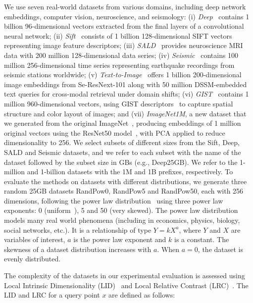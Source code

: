 We use seven real-world datasets from various domains, including deep network embeddings, computer vision, neuroscience, and seismology:  
(i) \emph{Deep}~\cite{url/data/deep1b} contains 1 billion 96-dimensional vectors extracted from the final layers of a convolutional neural network;  
(ii) \emph{Sift}~\cite{conf/icassp/jegou2011,url/data/sift} consists of 1 billion 128-dimensional SIFT vectors representing image feature descriptors;  
(iii) \emph{SALD}~\cite{url/data/eeg} provides neuroscience MRI data with 200 million 128-dimensional data series;  
(iv) \emph{Seismic}~\cite{url/data/seismic} contains 100 million 256-dimensional time series representing earthquake recordings from seismic stations worldwide;  
(v) \emph{Text-to-Image}~\cite{url/data/text2image} offers 1 billion 200-dimensional image embeddings from Se-ResNext-101 along with 50 million DSSM-embedded text queries for cross-modal retrieval under domain shifts;  
(vi) \emph{GIST}~\cite{gist} contains 1 million 960-dimensional vectors, using GIST descriptors~\cite{gistdesc} to capture spatial structure and color layout of images;  and
(vii) \emph{ImageNet1M}, a new dataset that we generated from the original ImageNet~\cite{imagenet}, producing embeddings of 1 million original vectors using the ResNet50 model~\cite{resnet}, with PCA applied to reduce dimensionality to 256. We select subsets of different sizes from the Sift, Deep, SALD and Seismic datasets, and we refer to each subset with the name of the dataset followed by the subset size in GBs (e.g., Deep25GB). 
We refer to the 1-million and 1-billion datasets with the 1M and 1B prefixes, respectively. 
To evaluate the methods on datasets with different distributions, we generate three random 25GB datasets RandPow0, %
RandPow5 and RandPow50, each with 256 dimensions, following the power law distribution~\cite{powerlaw} using three power law exponents: 0 (uniform~\cite{url/power-law}), 5 and 50 (very skewed).
The power law distribution models many real world phenomena (including in economics, physics, biology, social networks, etc.). 
It is a relationship of type $Y= kX^a$, where $Y$ and $X$ are variables of interest, $a$ is the power law exponent and $k$ is a constant. 
The skewness of a dataset distribution increases with $a$. 
When $a = 0$, the dataset is evenly distributed.

The complexity of the datasets in our experimental evaluation is assessed using Local Intrinsic Dimensionality (LID)~\cite{lid15,DBLP:journals/is/AumullerC21} and Local Relative Contrast (LRC)~\cite{rc,DBLP:journals/is/AumullerC21}. 
The LID and LRC for a query point \( x \) are defined as follows:


